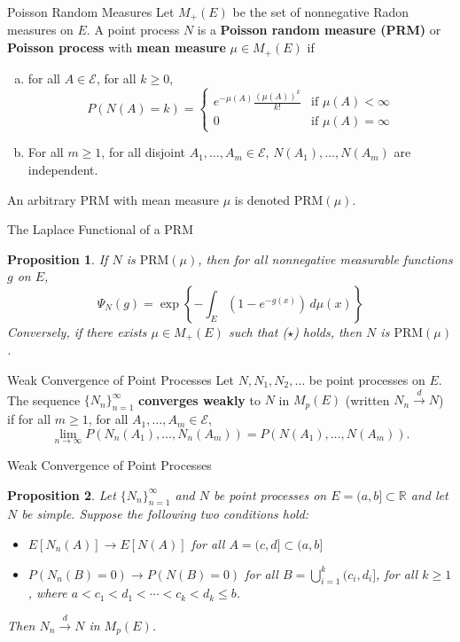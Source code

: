 \documentclass{beamer}
\newtheorem{proposition}{Proposition}
\begin{document}
\begin{frame}{Poisson Random Measures}
    Let $M_+(E)$ be the set of nonnegative Radon measures on $E$. A point process $N$ is a \textbf{Poisson random measure (PRM)} or \textbf{Poisson process} with \textbf{mean measure} $\mu \in M_+(E)$ if
    \begin{enumerate}[(a)]
    \item for all $A \in \mathcal{E}$, for all $k \ge 0$,
    \[
    P(N(A) = k) =
        \begin{cases}
            e^{-\mu(A)}\frac{(\mu(A))^k}{k!} & \text{if $\mu(A) < \infty$} \\
            0 & \text{if $\mu(A) = \infty$}
        \end{cases}
    \]
    \item For all $m \ge 1$, for all disjoint $A_1, \ldots, A_m \in \mathcal{E}$, $N(A_1), \ldots, N(A_m)$ are independent.
    \end{enumerate}
    An arbitrary PRM with mean measure $\mu$ is denoted $\text{PRM}(\mu)$.
\end{frame}

\begin{frame}{The Laplace Functional of a PRM}
    \begin{proposition}
        If $N$ is $\text{PRM}(\mu)$, then for all nonnegative measurable functions $g$ on $E$,
        \[
        \Psi_N(g) = \exp\left\{-\int_E \left(1 - e^{-g(x)}\right)\,d\mu(x)\right\} \tag{$\star$}
        \]
        Conversely, if there exists $\mu \in M_+(E)$ such that ($\star$) holds, then $N$ is $\text{PRM}(\mu)$.
    \end{proposition}
\end{frame}

\begin{frame}{Weak Convergence of Point Processes}
    Let $N, N_1, N_2, \ldots$ be point processes on $E$. The sequence $\{N_n\}_{n = 1}^{\infty}$ \textbf{converges weakly} to $N$ in $M_p(E)$ (written $N_n \xrightarrow{d} N$) if for all $m \ge 1$, for all $A_1, \ldots, A_m \in \mathcal{E}$,
    \[
    \lim_{n \to \infty} P(N_n(A_1), \ldots, N_n(A_m)) = P(N(A_1), \ldots, N(A_m)).
    \]
\end{frame}

\begin{frame}{Weak Convergence of Point Processes}
    \begin{proposition}
        Let $\{N_n\}_{n = 1}^{\infty}$ and $N$ be point processes on $E = (a, b] \subset \mathbb{R}$ and let $N$ be simple. Suppose the following two conditions hold:
        \begin{itemize}
            \item $E[N_n(A)] \to E[N(A)]$ for all $A = (c, d] \subset (a, b]$
            \item $P(N_n(B) = 0) \to P(N(B) = 0)$ for all $B = \bigcup_{i = 1}^k (c_i, d_i]$, for all $k \ge 1$, where $a < c_1 < d_1 < \cdots < c_k < d_k \le b$.
        \end{itemize}
        Then $N_n \xrightarrow{d} N$ in $M_p(E)$.
    \end{proposition}
\end{frame}
\end{document}
